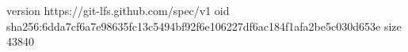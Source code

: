 version https://git-lfs.github.com/spec/v1
oid sha256:6dda7cf6a7e98635fc13c5494bf92f6e106227df6ac184f1afa2be5c030d653e
size 43840
